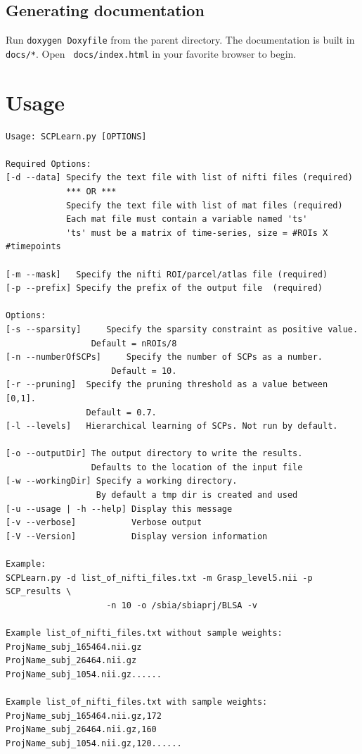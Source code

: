 \documentclass[12pt]{article}
\begin{document}
\subsection{Generating documentation}


Run \texttt{doxygen Doxyfile} from the parent directory.
The documentation is built in \texttt{docs/*}. Open \texttt{ docs/index.html} in your favorite browser to begin.

\section{Usage}
\begin{verbatim}
Usage: SCPLearn.py [OPTIONS] 

Required Options:
[-d --data] Specify the text file with list of nifti files (required) 
            *** OR ***
            Specify the text file with list of mat files (required) 
            Each mat file must contain a variable named 'ts'
            'ts' must be a matrix of time-series, size = #ROIs X #timepoints
                    
[-m --mask]   Specify the nifti ROI/parcel/atlas file (required)
[-p --prefix] Specify the prefix of the output file  (required)
    
Options:
[-s --sparsity] 	Specify the sparsity constraint as positive value. 
                 Default = nROIs/8 
[-n --numberOfSCPs] 	Specify the number of SCPs as a number. 
                     Default = 10.    
[-r --pruning]  Specify the pruning threshold as a value between [0,1]. 
                Default = 0.7.    
[-l --levels]  	Hierarchical learning of SCPs. Not run by default. 

[-o --outputDir] The output directory to write the results. 
                 Defaults to the location of the input file
[-w --workingDir] Specify a working directory. 
                  By default a tmp dir is created and used
[-u --usage | -h --help] Display this message
[-v --verbose]           Verbose output
[-V --Version]           Display version information

Example:
SCPLearn.py -d list_of_nifti_files.txt -m Grasp_level5.nii -p SCP_results \
                    -n 10 -o /sbia/sbiaprj/BLSA -v
    
Example list_of_nifti_files.txt without sample weights:
ProjName_subj_165464.nii.gz
ProjName_subj_26464.nii.gz
ProjName_subj_1054.nii.gz......

Example list_of_nifti_files.txt with sample weights:
ProjName_subj_165464.nii.gz,172
ProjName_subj_26464.nii.gz,160
ProjName_subj_1054.nii.gz,120......      
\end{verbatim}
\end{document}

